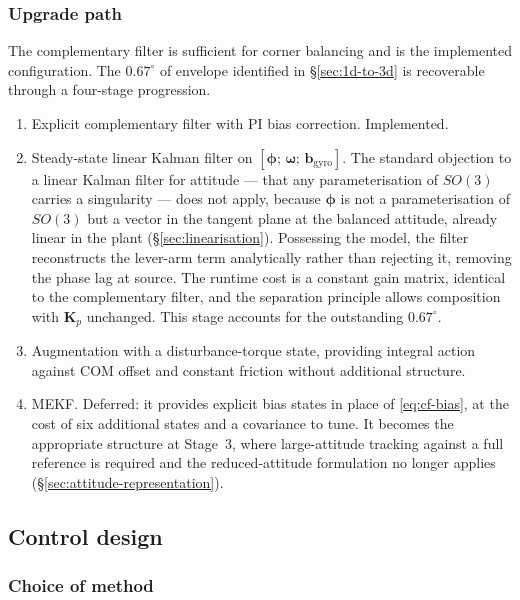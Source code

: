 \subsubsection{Upgrade path}
\label{sec:upgrade-path}

The complementary filter is sufficient for corner balancing and is the
implemented configuration. The $0.67^\circ$ of envelope identified in
\S\ref{sec:1d-to-3d} is recoverable through a four-stage progression.

\begin{enumerate}
  \item Explicit complementary filter with PI bias correction. Implemented.
  \item Steady-state linear Kalman filter on
        $[\bm{\phi};\,\bm{\omega};\,\bm{b}_{\mathrm{gyro}}]$. The standard
        objection to a linear Kalman filter for attitude --- that any
        parameterisation of $SO(3)$ carries a singularity --- does not apply,
        because $\bm{\phi}$ is not a parameterisation of $SO(3)$ but a vector
        in the tangent plane at the balanced attitude, already linear in the
        plant (\S\ref{sec:linearisation}). Possessing the model, the filter
        reconstructs the lever-arm term analytically rather than rejecting
        it, removing the phase lag at source. The runtime cost is a constant gain
        matrix, identical to the complementary filter, and the separation
 principle allows composition with $\bm{K}_p$ unchanged. This stage
        accounts for the outstanding $0.67^\circ$.
  \item Augmentation with a disturbance-torque state, providing integral
        action against COM offset and constant friction without additional
        structure.
  \item MEKF. Deferred: it provides explicit bias states in place of
        \eqref{eq:cf-bias}, at the cost of six additional states and a
        covariance to tune. It becomes the appropriate structure at Stage~3,
        where large-attitude tracking against a full reference is required
        and the reduced-attitude formulation no longer applies
        (\S\ref{sec:attitude-representation}).
\end{enumerate}

\subsection{Control design}
\label{sec:lqr}

\subsubsection{Choice of method}
\label{sec:why-lqr}

